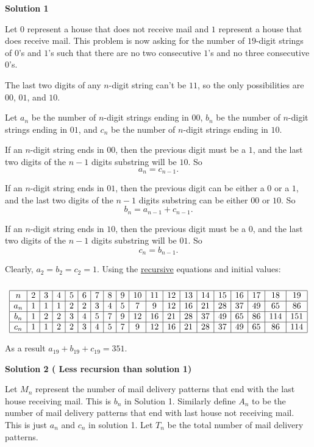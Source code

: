 \begin{enumerate}
\textbf{Solution 1}

Let $0$ represent a house that does not receive mail and $1$ represent a house that does receive mail. This problem is now asking for the number of $19$-digit strings of $0$'s and $1$'s such that there are no two consecutive $1$'s and no three consecutive $0$'s. 

 The last two digits of any $n$-digit string can't be $11$, so the only possibilities are $00$, $01$, and $10$. 

 Let $a_n$ be the number of $n$-digit strings ending in $00$, $b_n$ be the number of $n$-digit strings ending in $01$, and $c_n$ be the number of $n$-digit strings ending in $10$. 

 If an $n$-digit string ends in $00$, then the previous digit must be a $1$, and the last two digits of the $n-1$ digits substring will be $10$. So 
 \[a_{n} = c_{n-1}.\]

 If an $n$-digit string ends in $01$, then the previous digit can be either a $0$ or a $1$, and the last two digits of the $n-1$ digits substring can be either $00$ or $10$. So 
 \[b_{n} = a_{n-1} + c_{n-1}.\]

 If an $n$-digit string ends in $10$, then the previous digit must be a $0$, and the last two digits of the $n-1$ digits substring will be $01$. So 
 \[c_{n} = b_{n-1}.\]

 Clearly, $a_2=b_2=c_2=1$. Using the \href{https://artofproblemsolving.com/wiki/index.php?title=Recursion}{recursive} equations and initial values: 
 \[\begin{array}{|c|c|c|c|c|c|c|c|c|c|c|c|c|c|c|c|c|c|c|} \multicolumn{19}{c}{}\\\hline n&2&3&4&5&6&7&8&9&10&11&12&13&14&15&16&17&18&19\\\hline a_n&1&1&1&2&2&3&4&5&7&9&12&16&21&28&37&49&65&86\\\hline b_n&1&2&2&3&4&5&7&9&12&16&21&28&37&49&65&86&114&151\\\hline c_n&1&1&2&2&3&4&5&7&9&12&16&21&28&37&49&65&86&114\\\hline \end{array}\]

 As a result $a_{19}+b_{19}+c_{19}=\boxed{351}$.

 



\textbf{Solution 2 ( Less recursion than solution 1)}

Let $M_n$ represent the number of mail delivery patterns that end with the last house receiving mail. This is $b_n$ in Solution 1. Similarly define $A_n$ to be the number of mail delivery patterns that end with last house not receiving mail. This is just $a_n$ and $c_n$ in solution 1. Let $T_n$ be the total number of mail delivery patterns.


\end{enumerate}
